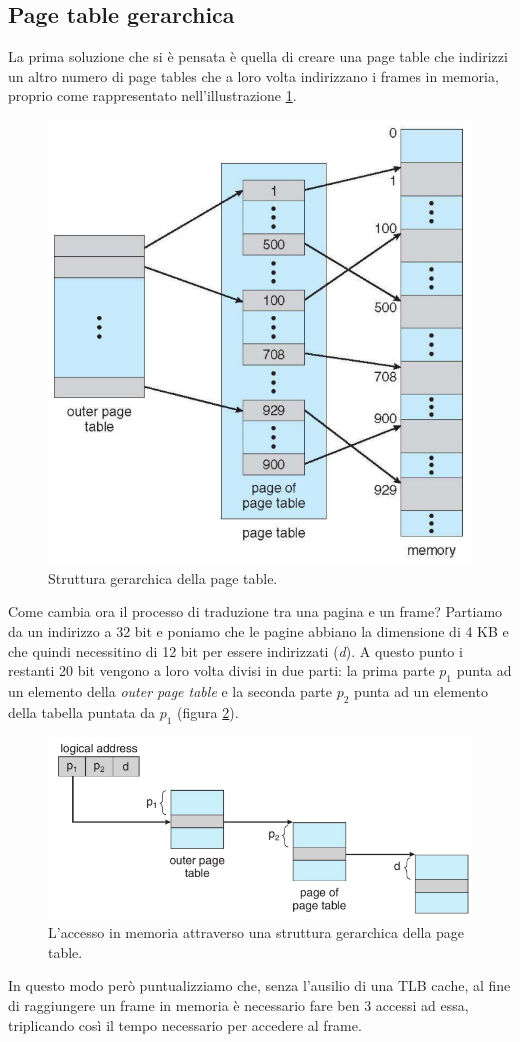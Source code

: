 \subsection{Page table gerarchica}
La prima soluzione che si è pensata è quella di creare una page table che indirizzi un altro numero di page tables che a loro volta indirizzano i frames in memoria, proprio come rappresentato nell'illustrazione \ref{fig:hierarchical_page_table}.
\begin{figure}[h]
    \centering
    \includegraphics[width = .45\textwidth]{../res/imgs/main memory/hierarchical_page_table.png}
    \caption{Struttura gerarchica della page table.}
    \label{fig:hierarchical_page_table}
\end{figure}
Come cambia ora il processo di traduzione tra una pagina e un frame? Partiamo da un indirizzo a 32 bit e poniamo che le pagine abbiano la dimensione di 4 KB e che quindi necessitino di 12 bit per essere indirizzati (\textit{d}). A questo punto i restanti 20 bit vengono a loro volta divisi in due parti: la prima parte $p_1$ punta ad un elemento della \textit{outer page table} e la seconda parte $p_2$ punta ad un elemento della tabella puntata da $p_1$ (figura \ref{fig:hierarchical_page_table_access}).
\begin{figure}[h]
    \centering
    \includegraphics[width = .6\textwidth]{../res/imgs/main memory/hierarchical_page_table_access.png}
    \caption{L'accesso in memoria attraverso una struttura gerarchica della page table.}
    \label{fig:hierarchical_page_table_access}
\end{figure}
In questo modo però puntualizziamo che, senza l'ausilio di una TLB cache, al fine di raggiungere un frame in memoria è necessario fare ben 3 accessi ad essa, triplicando così il tempo necessario per accedere al frame. 

